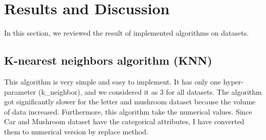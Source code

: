 \vspace{2cm}
\section{ Results and Discussion}
\vspace{2cm}

In this section, we reviewed the result of implemented algorithms on datasets.






\subsection{K-nearest neighbors algorithm (KNN)}
This algorithm is very simple and easy to implement. It has only one hyper-parameter (k\_neighbor), and we considered it as 3 for all datasets. The algorithm got significantly slower for the letter and mushroom dataset because the volume of data increased. Furthermore, this algorithm take the numerical values. Since Car and Mushroom dataset have the categorical attributes, I have converted them to numerical version by replace method. 

\begin{table}[H]
\centering
\caption{The accuracy of KNN on cancer dataset.}
\label{tab:tab_knn_canc}

\end{table}

\begin{table}[H]
\centering
\caption{The accuracy of KNN on cars dataset.}
\label{tab:tab_knn_cars}

\end{table}

\begin{table}[H]
\centering
\caption{The accuracy of KNN on ecol dataset.}
\label{tab:tab_knn_ecol}

\end{table}

\begin{table}[H]
\centering
\caption{The accuracy of KNN on letter dataset.}
\label{tab:tab_knn_letter}

\end{table}

